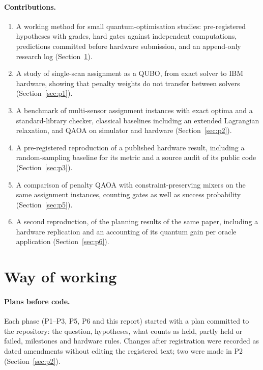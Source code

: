 \documentclass[11pt,a4paper]{article}
\begin{document}
\paragraph{Contributions.}
\begin{enumerate}
\item A working method for small quantum-optimisation studies: pre-registered hypotheses with grades, hard gates against independent
      computations, predictions committed before hardware submission, and an append-only research log (Section~\ref{sec:method}).
\item A study of single-scan assignment as a QUBO, from exact solver to IBM hardware, showing that penalty weights do not transfer
      between solvers (Section~\ref{sec:p1}).
\item A benchmark of \PtwoBenchInstances{} multi-sensor assignment instances with exact optima and a standard-library checker, classical
      baselines including an extended Lagrangian relaxation, and QAOA on simulator and hardware (Section~\ref{sec:p2}).
\item A pre-registered reproduction of a published hardware result, including a random-sampling baseline for its metric and a source
      audit of its public code (Section~\ref{sec:p3}).
\item A comparison of penalty QAOA with constraint-preserving mixers on the same assignment instances, counting gates as well as
      success probability (Section~\ref{sec:p5}).
\item A second reproduction, of the planning results of the same paper, including a hardware replication and an accounting of its
      quantum gain per oracle application (Section~\ref{sec:p6}).
\end{enumerate}

\section{Way of working}\label{sec:method}

\paragraph{Plans before code.} Each phase (P1--P3, P5, P6 and this report) started with a plan committed to the repository: the
question, hypotheses, what counts as held, partly held or failed, milestones and hardware rules. Changes after registration were
recorded as dated amendments without editing the registered text; two were made in P2 (Section~\ref{sec:p2}).
\end{document}
